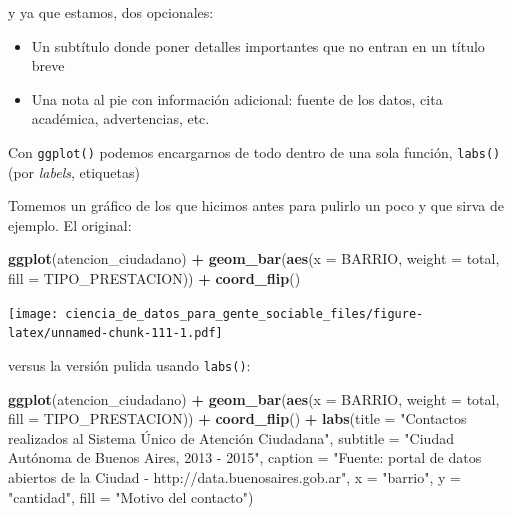 \documentclass[spanish,]{book}
\newenvironment{Shaded}{\begin{snugshade}}{\end{snugshade}}
\newcommand{\DataTypeTok}[1]{\textcolor[rgb]{0.13,0.29,0.53}{#1}}
\newcommand{\KeywordTok}[1]{\textcolor[rgb]{0.13,0.29,0.53}{\textbf{#1}}}
\newcommand{\NormalTok}[1]{#1}
\newcommand{\OperatorTok}[1]{\textcolor[rgb]{0.81,0.36,0.00}{\textbf{#1}}}
\newcommand{\StringTok}[1]{\textcolor[rgb]{0.31,0.60,0.02}{#1}}
\providecommand{\tightlist}{%
  \setlength{\itemsep}{0pt}\setlength{\parskip}{0pt}}
\begin{document}
y ya que estamos, dos opcionales:

\begin{itemize}
\tightlist
\item
  Un subtítulo donde poner detalles importantes que no entran en un título breve
\item
  Una nota al pie con información adicional: fuente de los datos, cita académica, advertencias, etc.
\end{itemize}

Con \texttt{ggplot()} podemos encargarnos de todo dentro de una sola función, \texttt{labs()} (por \emph{labels}, etiquetas)

Tomemos un gráfico de los que hicimos antes para pulirlo un poco y que sirva de ejemplo. El original:

\begin{Shaded}
\begin{Highlighting}[]
\KeywordTok{ggplot}\NormalTok{(atencion_ciudadano) }\OperatorTok{+}
\StringTok{    }\KeywordTok{geom_bar}\NormalTok{(}\KeywordTok{aes}\NormalTok{(}\DataTypeTok{x =}\NormalTok{ BARRIO, }\DataTypeTok{weight =}\NormalTok{ total, }\DataTypeTok{fill =}\NormalTok{ TIPO_PRESTACION)) }\OperatorTok{+}
\StringTok{    }\KeywordTok{coord_flip}\NormalTok{()}
\end{Highlighting}
\end{Shaded}

\texttt{[image: ciencia\_de\_datos\_para\_gente\_sociable\_files/figure-latex/unnamed-chunk-111-1.pdf]}

versus la versión pulida usando \texttt{labs()}:

\begin{Shaded}
\begin{Highlighting}[]
\KeywordTok{ggplot}\NormalTok{(atencion_ciudadano) }\OperatorTok{+}
\StringTok{    }\KeywordTok{geom_bar}\NormalTok{(}\KeywordTok{aes}\NormalTok{(}\DataTypeTok{x =}\NormalTok{ BARRIO, }\DataTypeTok{weight =}\NormalTok{ total, }\DataTypeTok{fill =}\NormalTok{ TIPO_PRESTACION)) }\OperatorTok{+}
\StringTok{    }\KeywordTok{coord_flip}\NormalTok{() }\OperatorTok{+}
\StringTok{    }\KeywordTok{labs}\NormalTok{(}\DataTypeTok{title =} \StringTok{"Contactos realizados al Sistema Único de Atención Ciudadana"}\NormalTok{,}
         \DataTypeTok{subtitle =} \StringTok{"Ciudad Autónoma de Buenos Aires, 2013 - 2015"}\NormalTok{,}
         \DataTypeTok{caption =} \StringTok{"Fuente: portal de datos abiertos de la Ciudad - http://data.buenosaires.gob.ar"}\NormalTok{,}
         \DataTypeTok{x =} \StringTok{"barrio"}\NormalTok{,}
         \DataTypeTok{y =} \StringTok{"cantidad"}\NormalTok{,}
         \DataTypeTok{fill =} \StringTok{"Motivo del contacto"}\NormalTok{)}
\end{Highlighting}
\end{Shaded}
\end{document}
